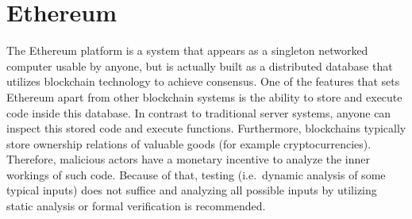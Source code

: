 \section{Ethereum}

The Ethereum platform is a system that appears as a singleton networked computer
usable by anyone, but is actually built as a distributed database that utilizes
blockchain technology to achieve consensus. One of the features that
sets Ethereum apart from other blockchain systems is the ability to store and
execute code inside this database. In contrast to traditional server systems,
anyone can inspect this stored code and execute functions. Furthermore,
blockchains typically store ownership relations of valuable goods
(for example cryptocurrencies). Therefore, malicious actors have a monetary
incentive to analyze the inner workings of such code. Because of that,
testing (i.e.\ dynamic analysis of some typical inputs) does not suffice
and analyzing all possible inputs by utilizing static analysis or formal verification
is recommended.
